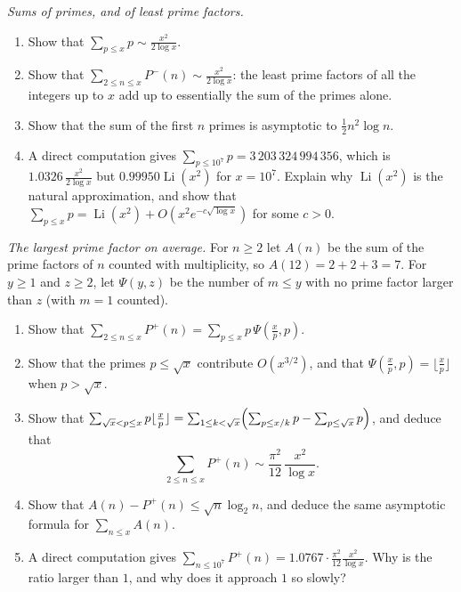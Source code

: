 \begin{exercise}[$\star$]\label{pb:leastpf}
\emph{Sums of primes, and of least prime factors.}
\begin{enumerate}[label=(\alph*)]
\item Show that $\sum_{p\le x}p\sim\frac{x^2}{2\log x}$.
\item Show that $\sum_{2\le n\le x}P^-(n)\sim\frac{x^2}{2\log x}$: the least prime factors of all the integers up to $x$ add up to essentially the sum of the primes alone.
\item Show that the sum of the first $n$ primes is asymptotic to $\frac12n^2\log n$.
\item A direct computation gives $\sum_{p\le10^7}p=3\,203\,324\,994\,356$, which is $1.0326\,\frac{x^2}{2\log x}$ but $0.99950\operatorname{Li}(x^2)$ for $x=10^7$. Explain why
$\operatorname{Li}(x^2)$ is the natural approximation, and show that $\sum_{p\le x}p=\operatorname{Li}(x^2)+O(x^2e^{-c\sqrt{\log x}})$ for some $c>0$.
\end{enumerate}
\end{exercise}

\begin{exercise}[$\star\star\star$]\label{pb:largestpf}
\emph{The largest prime factor on average.} For $n\ge2$ let $A(n)$ be the sum of the prime factors of $n$ counted with multiplicity, so $A(12)=2+2+3=7$. For $y\ge1$ and
$z\ge2$, let $\Psi(y,z)$ be the number of $m\le y$ with no prime factor larger than $z$ (with $m=1$ counted).
\begin{enumerate}[label=(\alph*)]
\item Show that $\sum_{2\le n\le x}P^+(n)=\sum_{p\le x}p\,\Psi(\frac xp,p)$.
\item Show that the primes $p\le\sqrt x$ contribute $O(x^{3/2})$, and that $\Psi(\frac xp,p)=\lfloor\frac xp\rfloor$ when $p>\sqrt x$.
\item Show that $\sum_{\sqrt x<p\le x}p\lfloor\frac xp\rfloor=\sum_{1\le k<\sqrt x}\Bigl(\sum_{p\le x/k}p-\sum_{p\le\sqrt x}p\Bigr)$, and deduce that
\[
\sum_{2\le n\le x}P^+(n)\sim\frac{\pi^2}{12}\,\frac{x^2}{\log x}.
\]
\item Show that $A(n)-P^+(n)\le\sqrt n\log_2n$, and deduce the same asymptotic formula for $\sum_{n\le x}A(n)$.
\item A direct computation gives $\sum_{n\le10^7}P^+(n)=1.0767\cdot\frac{\pi^2}{12}\frac{x^2}{\log x}$. Why is the ratio larger than $1$, and why does it approach $1$ so slowly?
\end{enumerate}
\end{exercise}

